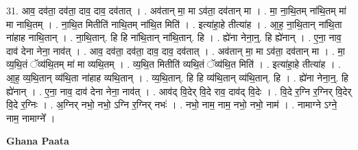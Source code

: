 \documentclass[17pt]{extarticle}
\begin{document}
31. आव॒ दव॑ता॒ दव॑ता॒ दाव॒ दाव॒ दव॑तात् । . अव॑तान् मा॒ मा ऽव॑ता॒ दव॑तान् मा । . मा॒ ना॒थि॒तम् ना॑थि॒तम् मा॑ मा नाथि॒तम् । . ना॒थि॒त मितीति॑ नाथि॒तम् ना॑थि॒त मिति॑ । . इत्या॑हा॒हे तीत्या॑ह । . आ॒ह॒ ना॒थि॒तान् ना॑थि॒ता ना॑हाह नाथि॒तान् । . ना॒थि॒तान्. हि हि ना॑थि॒तान् ना॑थि॒तान्. हि । . ह्ये॑ना नेना॒न्॒. हि ह्ये॑नान् । . ए॒ना॒ नाव॒ दाव॑ देना नेना॒ नाव॑त् । . आव॒ दव॑ता॒ दव॑ता॒ दाव॒ दाव॒ दव॑तात् । . अव॑तान् मा॒ मा ऽव॑ता॒ दव॑तान् मा । . मा॒ व्य॒थि॒तं ॅव्य॑थि॒तम् मा॑ मा व्यथि॒तम् । . व्य॒थि॒त मितीति॑ व्यथि॒तं ॅव्य॑थि॒त मिति॑ । . इत्या॑हा॒हे तीत्या॑ह । . आ॒ह॒ व्य॒थि॒तान् व्य॑थि॒ता ना॑हाह व्यथि॒तान् । . व्य॒थि॒तान्. हि हि व्य॑थि॒तान् व्य॑थि॒तान्. हि । . ह्ये॑ना नेना॒न्॒. हि ह्ये॑नान् । . ए॒ना॒ नाव॒ दाव॑ देना नेना॒ नाव॑त् । . आव॑द् वि॒देर् वि॒दे राव॒ दाव॑द् वि॒देः । . वि॒दे र॒ग्नि र॒ग्निर् वि॒देर् वि॒दे र॒ग्निः । . अ॒ग्निर् नभो॒ नभो॒ ऽग्नि र॒ग्निर् नभः॑ । . नभो॒ नाम॒ नाम॒ नभो॒ नभो॒ नाम॑ । . नामाग्ने ऽग्ने॒ नाम॒ नामाग्ने᳚ । \newline

\textbf{Ghana Paata } \newline
\end{document}
